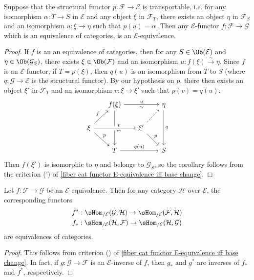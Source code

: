 \begin{corollary}\label{fiber cat functor equivalence is E-equivalence if transportable}
Suppose that the structural functor $p:\mathcal{F}\to \mathcal{E}$ is transportable, i.e. for any isomorphism $\alpha:T\to S$ in $\mathcal{E}$ and any object $\xi$ in $\mathcal{F}_T$, there exists an object $\eta$ in $\mathcal{F}_S$ and an isomorphism $u:\xi\to \eta$ such that $p(u)=\alpha$. Then any $\mathcal{E}$-functor $f:\mathcal{F}\to \mathcal{G}$ which is an equivalence of categories, is an $\mathcal{E}$-equivalence.
\end{corollary}
\begin{proof}
If $f$ is an an equivalence of categories, then for any $S\in\Ob(\mathcal{E})$ and $\eta\in\Ob(\mathcal{G}_S)$, there exists $\xi\in\Ob(\mathcal{F})$ and an isomorphism $u:f(\xi)\stackrel{\sim}{\to }\eta$. Since $f$ is an $\mathcal{E}$-functor, if $T=p(\xi)$, then $q(u)$ is an isomorphism from $T$ to $S$ (where $q:\mathcal{G}\to \mathcal{E}$ is the structural functor). By our hypothesis on $p$, there then exists an object $\xi'$ in $\mathcal{F}_T$ and an isomorphism $v:\xi\to \xi'$ such that $p(v)=q(u)$:
\[\begin{tikzcd}[row sep=6mm, column sep=6mm]
&f(\xi)\ar[dd]\ar[rr,"u","\sim"']&&\eta\ar[dd,"q"]\\
\xi\ar[ru,"f"]\ar[rr,"v","\sim"',pos=0.6,crossing over]\ar[rd,"p"]&&\xi'\ar[rd,"p"]\ar[ru,dashed]&\\
&T\ar[rr,"q(u)"]&&S
\end{tikzcd}\]
Then $f(\xi')$ is isomorphic to $\eta$ and belongs to $\mathcal{G}_S$, so the corollary follows from the criterion (') of \cref{fiber cat functor E-equivalence iff base change}.
\end{proof}
\begin{corollary}\label{fiber cat functor E-equivalence induces sHom equivalence}
Let $f:\mathcal{F}\to \mathcal{G}$ be an $\mathcal{E}$-equivalence. Then for any category $\mathcal{H}$ over $\mathcal{E}$, the corresponding functors
\begin{gather*}
f^*:\sHom_{/\mathcal{E}}(\mathcal{G},\mathcal{H})\to \sHom_{/\mathcal{E}}(\mathcal{F},\mathcal{H})\\
f_*:\sHom_{/\mathcal{E}}(\mathcal{H},\mathcal{F})\to \sHom_{/\mathcal{E}}(\mathcal{H},\mathcal{G})
\end{gather*}
are equivalences of categories.
\end{corollary}
\begin{proof}
This follows from criterion () of \cref{fiber cat functor E-equivalence iff base change}. In fact, if $g:\mathcal{G}\to \mathcal{F}$ is an $\mathcal{E}$-inverse of $f$, then $g_*$ and $g^*$ are inverses of $f_*$ and $f^*$, respectively.
\end{proof}
